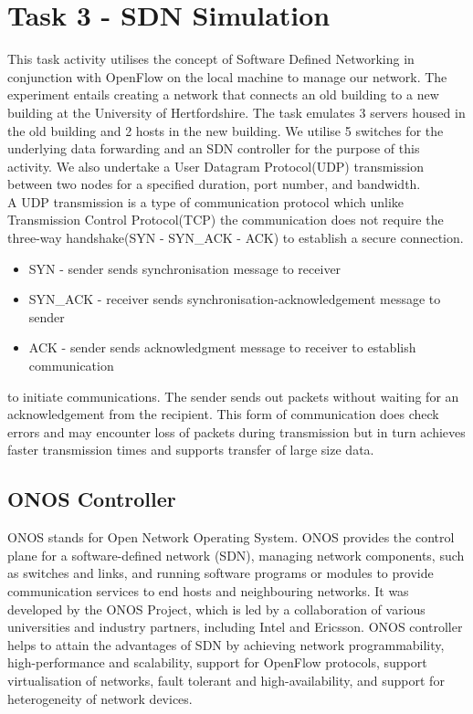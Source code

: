 \documentclass{article}
\begin{document}
\section{Task 3 - SDN Simulation}
This task activity utilises the concept of Software Defined Networking in conjunction with OpenFlow on the local machine to manage our network. The experiment entails creating a network that connects an old building to a new building at the University of Hertfordshire. The task emulates 3 servers housed in the old building and 2 hosts in the new building. We utilise 5 switches for the underlying data forwarding and an SDN controller for the purpose of this activity. We also undertake a User Datagram Protocol(UDP) transmission  between two nodes for a specified duration, port number, and bandwidth. \\ A UDP transmission is a type of communication protocol which unlike Transmission Control Protocol(TCP)\cite{CONRAD201263} the communication does not require the three-way handshake(SYN - SYN\_ACK - ACK) to establish a secure connection.
	\begin{itemize}
		\item SYN - sender sends synchronisation message to receiver
		\item SYN\_ACK - receiver sends synchronisation-acknowledgement message to sender
		\item ACK - sender sends acknowledgment message to receiver to establish communication
	\end{itemize}  
to initiate communications. The sender sends out packets without waiting for an acknowledgement from the recipient. This form of communication does check errors and may encounter loss of packets during transmission but in turn achieves faster transmission times and supports transfer of large size data.
\subsection{ONOS Controller}
ONOS stands for Open Network Operating System. ONOS provides the control plane for a software-defined network (SDN), managing network components, such as switches and links, and running software programs or modules to provide communication services to end hosts and neighbouring networks. It was developed by the ONOS Project, which is led by a collaboration of various universities and industry partners, including Intel and Ericsson. ONOS controller helps to attain the advantages of SDN by achieving network programmability, high-performance and scalability, support for OpenFlow protocols, support virtualisation of networks, fault tolerant and high-availability, and support for heterogeneity of network devices.
\end{document}
